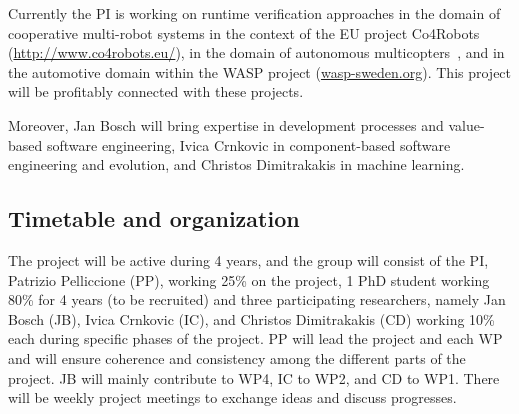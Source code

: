 \documentclass[12pt]{article}
\newcommand{\nb}[2]{
    \fcolorbox{gray}{yellow}{\bfseries\sffamily\scriptsize#1}
    {\sf\small$\blacktriangleright$\textit{#2}$\blacktriangleleft$}
   }
\newcommand{\nb}[2]{}
\newcommand\patrizio[1]{\nb{Patrizio}{#1}}
\begin{document}
Currently the PI is working on runtime verification approaches in the domain of cooperative multi-robot systems in the context of the EU project Co4Robots ({\small \url{http://www.co4robots.eu/}}), in the domain of 
autonomous multicopters~\cite{ASE2015}, and in the automotive domain within the WASP project ({\small \url{wasp-sweden.org}}). This project will be profitably connected with these projects. %

Moreover, Jan Bosch will bring expertise in development processes and value-based software engineering, Ivica Crnkovic in component-based software engineering and evolution, and Christos Dimitrakakis in machine learning. 

\subsection{Timetable and organization}
\vspace{-.2cm}
The \name{} project will be active during 4 years, and the group will consist of the PI, Patrizio Pelliccione (PP), working
25\% on the project, 1 PhD student working 80\%  for 4 years (to be recruited) and three participating researchers, namely Jan Bosch (JB), Ivica Crnkovic (IC), and Christos Dimitrakakis (CD) working 10\% each during specific phases of the project.  PP will lead the project and each WP and will ensure coherence and consistency among the different parts of the project. JB will mainly contribute to WP4, IC to WP2, and CD to WP1. There will be weekly project meetings to exchange ideas and discuss progresses.
\end{document}
